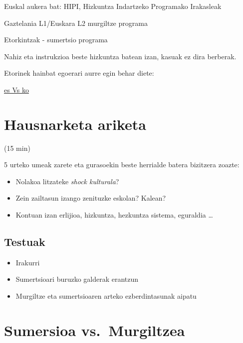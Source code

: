\documentclass[
]{book}
\providecommand{\tightlist}{%
  \setlength{\itemsep}{0pt}\setlength{\parskip}{0pt}}
\begin{document}
Euskal aukera bat: HIPI, Hizkuntza Indartzeko Programako Irakasleak

Gaztelania L1/Euskara L2 murgiltze programa

Etorkintzak - sumertsio programa

Nahiz eta instrukzioa beste hizkuntza batean izan, kasuak ez dira berberak.

Etorinek hainbat egoerari aurre egin behar diete:

\href{https://www.youtube.com/watch?v=Z1PduFLoJ0Y}{es Vs ko}

\hypertarget{hausnarketa-ariketa}{%
\section{Hausnarketa ariketa}\label{hausnarketa-ariketa}}

(15 min)

5 urteko umeak zarete eta gurasoekin beste herrialde batera bizitzera zoazte:

\begin{itemize}
\tightlist
\item
  Nolakoa litzateke \emph{shock kulturala}?
\item
  Zein zailtasun izango zenituzke eskolan? Kalean?
\item
  Kontuan izan erlijioa, hizkuntza, hezkuntza sistema, eguraldia \ldots{}
\end{itemize}

\hypertarget{testuak}{%
\subsection{Testuak}\label{testuak}}

\begin{itemize}
\tightlist
\item
  Irakurri
\item
  Sumertsioari buruzko galderak erantzun
\item
  Murgiltze eta sumertsioaren arteko ezberdintasunak aipatu
\end{itemize}

\hypertarget{sumersioa-vs.-murgiltzea}{%
\section{Sumersioa vs.~Murgiltzea}\label{sumersioa-vs.-murgiltzea}}
\end{document}
